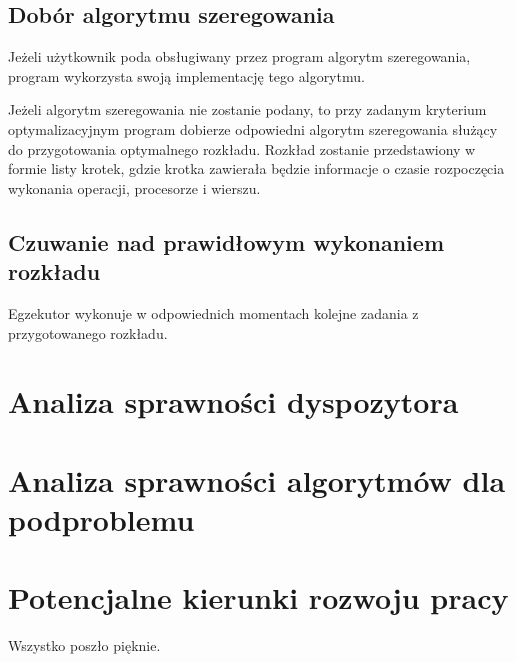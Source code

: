 \documentclass[brudnopis]{xmgr}
\begin{document}

\section{Dobór algorytmu szeregowania}


Jeżeli użytkownik poda obsługiwany przez program algorytm szeregowania, program wykorzysta swoją implementację tego algorytmu.

Jeżeli algorytm szeregowania nie zostanie podany, to przy zadanym kryterium optymalizacyjnym program dobierze odpowiedni algorytm szeregowania służący do przygotowania optymalnego rozkładu.
Rozkład zostanie przedstawiony w formie listy krotek, gdzie krotka zawierała będzie informacje o czasie rozpoczęcia wykonania operacji, procesorze i wierszu. 


\section{Czuwanie nad prawidłowym wykonaniem rozkładu}

Egzekutor wykonuje w odpowiednich momentach kolejne zadania z przygotowanego rozkładu.



\chapter{Analiza sprawności dyspozytora}


\chapter{Analiza sprawności algorytmów dla podproblemu}


\chapter{Potencjalne kierunki rozwoju pracy}


\summary

Wszystko poszło pięknie.
\end{document}
